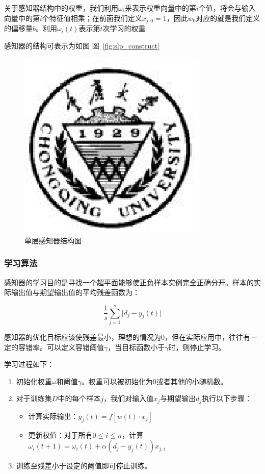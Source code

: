 \documentclass[bachelor,zhspacing]{cqu}  %
\def\tightlist{}
\begin{document}
关于感知器结构中的权重，我们利用\(\omega_{i}\)来表示权重向量中的第\(i\)个值，将会与输入向量中的第\(i\)个特征值相乘；在前面我们定义\(x_{j,0} = 1\)，因此\(w_{0}\)对应的就是我们定义的偏移量\(b\)。利用\(\omega_{i}(t)\)表示第\(t\)次学习的权重

感知器的结构可表示为如图 图~\ref{fig:slp_construct}

\begin{figure}[htbp]
\centering
\includegraphics{./pic/cqu.eps}
\caption{单层感知器结构图}\label{fig:slpux5fconstruct}
\end{figure}

\subsubsection{学习算法}\label{ux5b66ux4e60ux7b97ux6cd5}

感知器的学习目的是寻找一个超平面能够使正负样本实例完全正确分开。样本的实际输出值与期望输出值的平均残差函数为：

\[\frac{1}{s}\sum_{j = 1}^{s}\lvert d_{j}-y_{j}(t)\rvert\]

感知器的优化目标应该使残差最小，理想的情况为0，但在实际应用中，往往有一定的容错率。可以定义容错阈值\(\gamma\)，当目标函数小于\(\gamma\)时，则停止学习。

学习过程如下：

\begin{enumerate}
\def\labelenumi{\arabic{enumi}.}
\tightlist
\item
  初始化权重\(\omega\)和阈值\(\gamma\)。权重可以被初始化为0或者其他的小随机数。
\item
  对于训练集\(D\)中的每个样本\(j\)，我们对输入值\(x_{j}\)与期望输出\(d_{j}\)执行以下步骤：

  \begin{itemize}
  \tightlist
  \item
    计算实际输出：\(y_{j}(t)= f[w(t)\cdot x_{j}]\)
  \item
    更新权值：对于所有\(0\le i \le n\)，计算\(\omega_{i}(t+1) = \omega_{i}(t) + \alpha(d_{j} - y_{j}(t))x_{j,i}\)
  \end{itemize}
\item
  训练至残差小于设定的阈值即可停止训练。
\end{enumerate}
\end{document}
